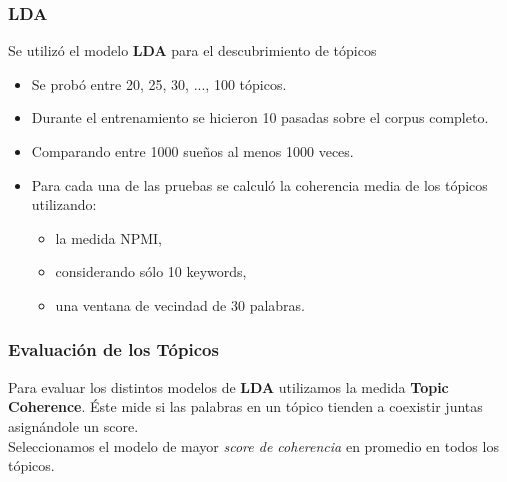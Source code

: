 \documentclass{beamer}
\begin{document}
\begin{frame}
\frametitle{LDA}
Se utilizó el modelo \textbf{LDA} para el descubrimiento de tópicos
\begin{itemize}
[triangle]
	\item<1-> Se probó entre 20, 25, 30, ..., 100 tópicos.
	\item<1-> Durante el entrenamiento se hicieron 10 pasadas sobre el corpus completo.
	\item<1-> Comparando entre 1000 sueños al menos 1000 veces.
	\item<1-> Para cada una de las pruebas se calculó la coherencia media de los tópicos utilizando:
	\begin{itemize}
	[circle]
		\item la medida NPMI,
		\item considerando sólo 10 keywords,
		\item una ventana de vecindad de 30 palabras.
	\end{itemize}	
\end{itemize}
\end{frame}

\begin{frame}
\frametitle{Evaluación de los Tópicos}
Para evaluar los distintos modelos de \textbf{LDA} utilizamos la medida \textbf{Topic Coherence}. Éste mide si las palabras en un tópico tienden a coexistir juntas asignándole un score.\\
Seleccionamos el modelo de mayor \textit{score de coherencia} en promedio en todos los tópicos.

\end{frame}
\end{document}
